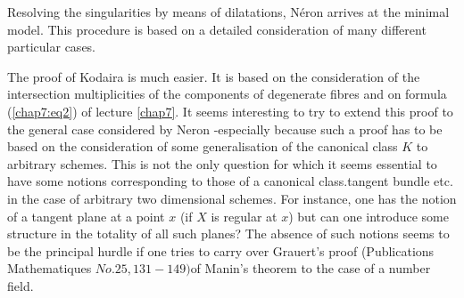 Resolving the  singularities by means of dilatations, N\'eron arrives at
the minimal model. This procedure is based on a detailed consideration of
many different particular cases. 

The proof of Kodaira is much easier. It is based on the consideration
of the intersection multiplicities of the components of degenerate
fibres and on formula (\ref{chap7:eq2}) of lecture \ref{chap7}. It
seems interesting to 
try to extend this proof to the  general case considered by Neron
-especially because such a proof has to be based on the consideration
of some generalisation of the canonical class $K$ to arbitrary
schemes. This is not the only question for which it seems essential
to have some notions corresponding to those of a canonical
class.tangent bundle etc. in the case of arbitrary two dimensional
schemes. For instance, one has the notion of a tangent plane at a
point $x$ (if $X$ is regular at  $x$) but  can one introduce some
structure in the totality  of all such planes? The absence of such
notions seems to be the principal hurdle if one tries to carry over
Grauert's proof (Publications Mathematiques $No.25, 131-149)$of
Manin's theorem to the case of a number field. 

